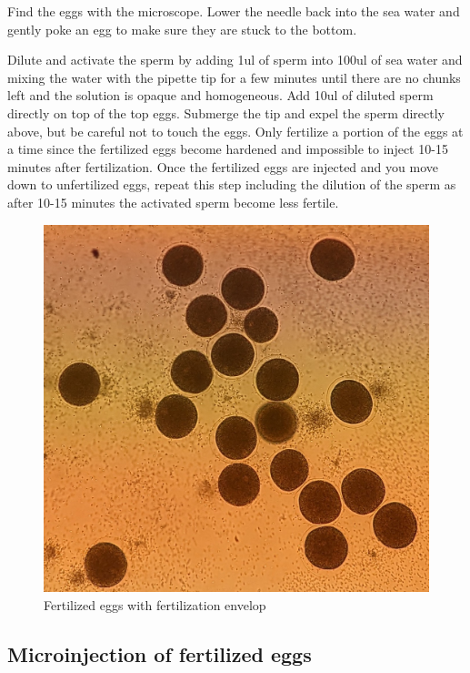 \documentclass[
  letterpaper,
  DIV=11,
  numbers=noendperiod]{scrartcl}
\begin{document}
Find the eggs with the microscope. Lower the needle back into the sea
water and gently poke an egg to make sure they are stuck to the bottom.

Dilute and activate the sperm by adding 1ul of sperm into 100ul of sea
water and mixing the water with the pipette tip for a few minutes until
there are no chunks left and the solution is opaque and homogeneous. Add
10ul of diluted sperm directly on top of the top eggs. Submerge the tip
and expel the sperm directly above, but be careful not to touch the
eggs. Only fertilize a portion of the eggs at a time since the
fertilized eggs become hardened and impossible to inject 10-15 minutes
after fertilization. Once the fertilized eggs are injected and you move
down to unfertilized eggs, repeat this step including the dilution of
the sperm as after 10-15 minutes the activated sperm become less
fertile.

\begin{figure}

{\centering \includegraphics[width=6.25in,height=\textheight]{micro_photos/included/fertilized.jpg}

}

\caption{Fertilized eggs with fertilization envelop}

\end{figure}

\hypertarget{microinjection-of-fertilized-eggs}{%
\subsection{Microinjection of fertilized
eggs}\label{microinjection-of-fertilized-eggs}}
\end{document}
